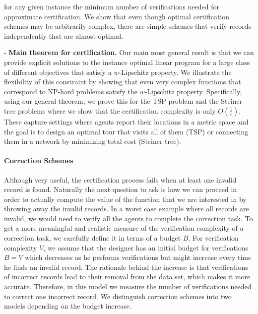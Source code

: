 \begin{Itemize}
           for any given instance the minimum number of verifications needed for approximate certification. We show that even though optimal
           certification schemes may be arbitrarily complex, there are simple schemes that verify records independently that are almost-optimal.
  \item[-] {\bf Main theorem for certification.} Our main most general result is that we can provide explicit solutions to the instance optimal
           linear program for a large class of different objectives that satisfy a $w$-Lipschitz property. We illustrate the flexibility of this
           constraint by showing that even very complex functions that correspond to NP-hard problems satisfy the $w$-Lipschitz property.
           Specifically, using our general theorem, we prove this for the TSP problem and the Steiner tree problems where we show that the
           certification complexity is only $O(\frac 1 \varepsilon)$. These capture settings where agents report their locations in a metric space
           and the goal is to design an optimal tour that visits all of them (TSP) or connecting them in a network by minimizing total cost
           (Steiner tree).
\end{Itemize}

\paragraph{Correction Schemes} Although very useful, the certification process fails when at least one invalid record is found. Naturally the next
question to ask is how we can proceed in order to actually compute the value of the function that we are interested in by throwing away the invalid
records. In a worst case example where all records are invalid, we would need to verify all the agents to complete the correction task. To get a more
meaningful and realistic measure of the verification complexity of a correction task, we carefully define it in terms of a budget $B$. For verification
complexity $V$, we assume that the designer has an initial budget for verifications $B = V$ which decreases as he performs verifications but might
increase every time he finds an invalid record.
The rationale behind the increase is that  verifications of incorrect records lead to their removal from the data set, which makes it more accurate. Therefore, in this model we measure the number of verifications needed to correct one incorrect record.
We distinguish correction schemes
into two models depending on the budget increase.

